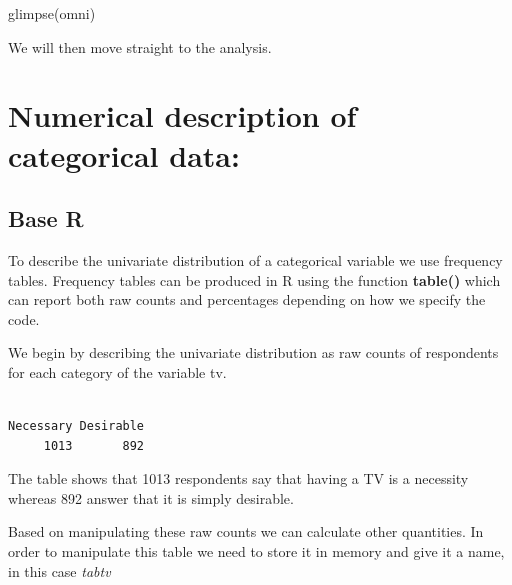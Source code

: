 \documentclass[
  letterpaper,
  DIV=11,
  numbers=noendperiod]{scrreprt}
\newenvironment{Shaded}{\begin{snugshade}}{\end{snugshade}}
\newcommand{\CommentTok}[1]{\textcolor[rgb]{0.37,0.37,0.37}{#1}}
\newcommand{\FunctionTok}[1]{\textcolor[rgb]{0.28,0.35,0.67}{#1}}
\newcommand{\NormalTok}[1]{\textcolor[rgb]{0.00,0.23,0.31}{#1}}
\newcommand{\OtherTok}[1]{\textcolor[rgb]{0.00,0.23,0.31}{#1}}
\newcommand{\SpecialCharTok}[1]{\textcolor[rgb]{0.37,0.37,0.37}{#1}}
\begin{document}
\begin{Shaded}
\begin{Highlighting}[]
\FunctionTok{glimpse}\NormalTok{(omni)}
\end{Highlighting}
\end{Shaded}

We will then move straight to the analysis.

\section{Numerical description of categorical
data:}\label{numerical-description-of-categorical-data}

\subsection{Base R}\label{base-r}

To describe the univariate distribution of a categorical variable we use
frequency tables. Frequency tables can be produced in R using the
function \textbf{table()} which can report both raw counts and
percentages depending on how we specify the code.

We begin by describing the univariate distribution as raw counts of
respondents for each category of the variable tv.

\begin{Shaded}
\end{Shaded}

\begin{verbatim}

Necessary Desirable 
     1013       892 
\end{verbatim}

The table shows that 1013 respondents say that having a TV is a
necessity whereas 892 answer that it is simply desirable.

Based on manipulating these raw counts we can calculate other
quantities. In order to manipulate this table we need to store it in
memory and give it a name, in this case \emph{tabtv}

\begin{Shaded}
\end{Shaded}
\end{document}
